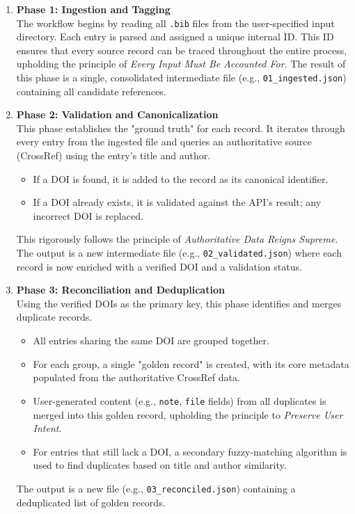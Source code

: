 \documentclass[11pt, a4paper]{article}
\begin{document}
\begin{enumerate}[label=\arabic*.]
    \item \textbf{Phase 1: Ingestion and Tagging} \\
    The workflow begins by reading all \texttt{.bib} files from the user-specified input directory. Each entry is parsed and assigned a unique internal ID. This ID ensures that every source record can be traced throughout the entire process, upholding the principle of \textit{Every Input Must Be Accounted For}. The result of this phase is a single, consolidated intermediate file (e.g., \texttt{01\_ingested.json}) containing all candidate references.

    \item \textbf{Phase 2: Validation and Canonicalization} \\
    This phase establishes the "ground truth" for each record. It iterates through every entry from the ingested file and queries an authoritative source (CrossRef) using the entry's title and author. 
    \begin{itemize}[leftmargin=*]
        \item If a DOI is found, it is added to the record as its canonical identifier.
        \item If a DOI already exists, it is validated against the API's result; any incorrect DOI is replaced.
    \end{itemize}
    This rigorously follows the principle of \textit{Authoritative Data Reigns Supreme}. The output is a new intermediate file (e.g., \texttt{02\_validated.json}) where each record is now enriched with a verified DOI and a validation status.

    \item \textbf{Phase 3: Reconciliation and Deduplication} \\
    Using the verified DOIs as the primary key, this phase identifies and merges duplicate records.
    \begin{itemize}[leftmargin=*]
        \item All entries sharing the same DOI are grouped together.
        \item For each group, a single "golden record" is created, with its core metadata populated from the authoritative CrossRef data.
        \item User-generated content (e.g., \texttt{note}, \texttt{file} fields) from all duplicates is merged into this golden record, upholding the principle to \textit{Preserve User Intent}.
        \item For entries that still lack a DOI, a secondary fuzzy-matching algorithm is used to find duplicates based on title and author similarity.
    \end{itemize}
    The output is a new file (e.g., \texttt{03\_reconciled.json}) containing a deduplicated list of golden records.


\end{enumerate}
\end{document}
